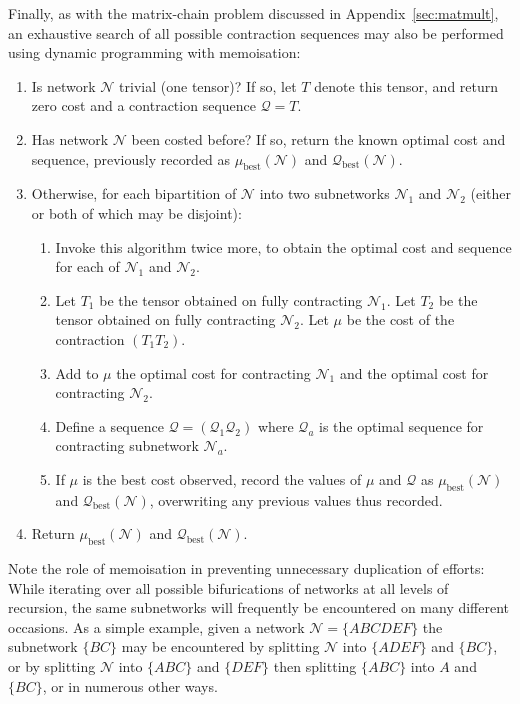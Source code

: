 \documentclass[aps,pre,reprint,superscriptaddress,amsfonts,amsmath,showpacs,nofootinbib,floatfix]{revtex4-1}
\newcommand{\mrm}[1]{\mathrm{#1}}
\newcommand{\mc}[1]{\mathcal{#1}}
\newcommand{\aref}[1]{Appendix~\ref{#1}}
\newcommand{\fuse}[2]{(#1#2)} %
\begin{document}
Finally, as with the matrix-chain problem discussed in \aref{sec:matmult}, an exhaustive search of all possible contraction sequences may also be performed using dynamic programming with memoisation: 
\begin{enumerate}
\item Is network $\mc{N}$ trivial (one tensor)? If so, let $T$ denote this tensor, and return zero cost and a contraction sequence $\mc{Q}=T$.
\item Has network $\mc{N}$ been costed before? If so, return the known optimal cost and sequence, previously recorded as $\mu_\mrm{best}(\mc{N})$ and $\mc{Q}_\mrm{best}(\mc{N})$.
\item Otherwise, for each bipartition of $\mc{N}$ into two subnetworks $\mc{N}_1$ and $\mc{N}_2$ (either or both of which may be disjoint):
\begin{enumerate}
\item Invoke this algorithm twice more, to obtain the optimal cost and sequence for each of $\mc{N}_1$ and $\mc{N}_2$.
\item Let $T_1$ be the tensor obtained on fully contracting $\mc{N}_1$. Let $T_2$ be the tensor obtained on fully contracting $\mc{N}_2$. Let $\mu$ be the cost of the contraction $\fuse{T_1}{T_2}$.
\item Add to $\mu$ the optimal cost for contracting $\mc{N}_1$ and the optimal cost for contracting $\mc{N}_2$.
\item Define a sequence $\mc{Q}=(\mc{Q}_1\mc{Q}_2)$ where $\mc{Q}_a$ is the optimal sequence for contracting subnetwork $\mc{N}_a$.
\item If $\mu$ is the best cost observed, record the values of $\mu$ and $\mc{Q}$ as $\mu_\mrm{best}(\mc{N})$ and $\mc{Q}_\mrm{best}(\mc{N})$, overwriting any previous values thus recorded.
\end{enumerate}
\item Return $\mu_\mrm{best}(\mc{N})$ and $\mc{Q}_\mrm{best}(\mc{N})$.
\end{enumerate}
Note the role of memoisation in preventing unnecessary duplication of efforts: While iterating over all possible bifurications of networks at all levels of recursion, the same subnetworks will frequently be encountered on many different occasions. As a simple example, given a network $\mc{N}=\{ABCDEF\}$ the subnetwork $\{BC\}$ may be encountered by splitting $\mc{N}$ into $\{ADEF\}$ and $\{BC\}$, or by splitting $\mc{N}$ into $\{ABC\}$ and $\{DEF\}$ then splitting $\{ABC\}$ into $A$ and $\{BC\}$, or in numerous other ways.
\end{document}
